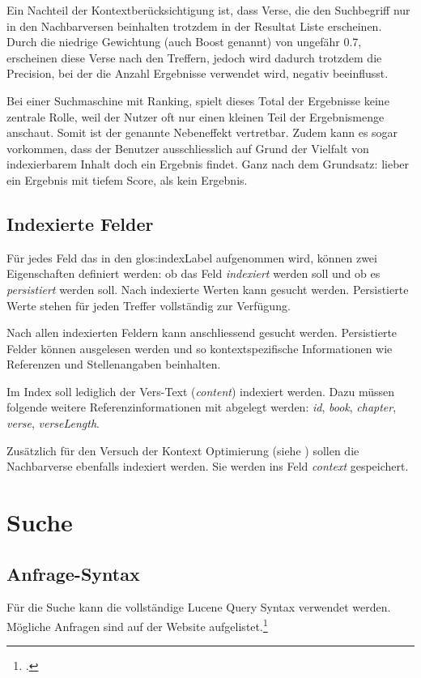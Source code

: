 Ein Nachteil der Kontextberücksichtigung ist, dass Verse, die den Suchbegriff nur in den Nachbarversen beinhalten trotzdem in der Resultat Liste erscheinen.
Durch die niedrige Gewichtung (auch Boost genannt) von ungefähr 0.7, erscheinen diese Verse nach den Treffern, jedoch wird dadurch trotzdem die Precision, bei der die Anzahl Ergebnisse verwendet wird, negativ beeinflusst.

Bei einer Suchmaschine mit Ranking, spielt dieses Total der Ergebnisse keine zentrale Rolle, weil der Nutzer oft nur einen kleinen Teil der Ergebnismenge anschaut.
Somit ist der genannte Nebeneffekt vertretbar.
Zudem kann es sogar vorkommen, dass der Benutzer ausschliesslich auf Grund der Vielfalt von indexierbarem Inhalt doch ein Ergebnis findet.
Ganz nach dem Grundsatz: lieber ein Ergebnis mit tiefem Score, als kein Ergebnis.


\subsection{Indexierte Felder}
Für jedes Feld das in den \gls{glos:indexLabel} aufgenommen wird, können zwei Eigenschaften definiert werden: ob das Feld \textit{indexiert} werden soll und ob es \textit{persistiert} werden soll.
Nach indexierte Werten kann gesucht werden. Persistierte Werte stehen für jeden Treffer vollständig zur Verfügung.

Nach allen indexierten Feldern kann anschliessend gesucht werden. Persistierte Felder können ausgelesen werden und so kontextspezifische Informationen wie Referenzen und Stellenangaben beinhalten.

Im Index soll lediglich der Vers-Text (\textit{content}) indexiert werden.
Dazu müssen folgende weitere Referenzinformationen mit abgelegt werden: \textit{id}, \textit{book}, \textit{chapter}, \textit{verse}, \textit{verseLength}.

Zusätzlich für den Versuch der Kontext Optimierung (siehe ) sollen die Nachbarverse ebenfalls indexiert werden. Sie werden ins Feld \textit{context} gespeichert.


\section{Suche}
\subsection{Anfrage-Syntax}
Für die Suche kann die vollständige Lucene Query Syntax verwendet werden. Mögliche Anfragen sind auf der Website aufgelistet.\footcite{Lucene_Query_Syntax_Lucene_Tutorial_2016-05-09}

